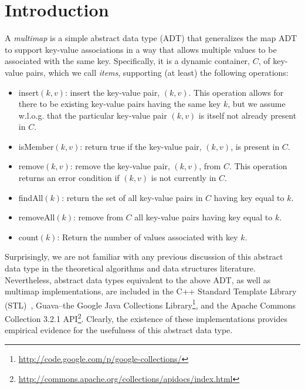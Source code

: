 \documentclass[11pt,letterpaper]{article}
\begin{document}
\section{Introduction}

A \emph{multimap} is a simple abstract data type (ADT) that generalizes the 
map ADT to support key-value associations in a way that allows
multiple values to be associated with the same key.
Specifically, it is a dynamic container, $C$, of key-value
pairs, which we call \emph{items}, 
supporting (at least) the following operations:
\begin{itemize}
\item
insert$(k,v)$: insert the key-value pair, $(k,v)$. This operation
allows for there to be existing key-value pairs having the same
key $k$, but we assume w.l.o.g. that the particular key-value pair
$(k,v)$ is itself not already present in $C$.
\item
isMember$(k,v)$: return true if the key-value pair, $(k,v)$, is
present in $C$.
\item
remove$(k,v)$: remove the key-value pair, $(k,v)$, from $C$.
This operation
returns an error condition if $(k,v)$ is not currently in $C$.
\item
findAll$(k)$: return the set of all key-value pairs
in $C$ having key equal to $k$.
\item
removeAll$(k)$: remove from $C$ all key-value pairs
having key equal to $k$.
\item
count$(k)$: Return the number of values associated with key $k$.
\end{itemize}

Surprisingly, we are not familiar with any previous discussion of this
abstract data type in the theoretical algorithms and data structures
literature.  Nevertheless, abstract data types equivalent to the above
ADT, as well as multimap implementations, are included in the C++
Standard Template Library (STL)~\cite{ms-tstrc-95}, Guava--the Google Java
Collections 
Library\footnote{\url{http://code.google.com/p/google-collections/}}, 
and the Apache Commons Collection 3.2.1 
API\footnote{\url{http://commons.apache.org/collections/apidocs/index.html}}.  
Clearly, the existence of these implementations provides
empirical evidence for the usefulness of this abstract data type.
\end{document}
